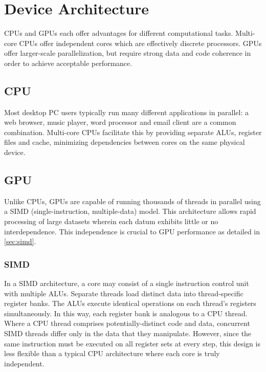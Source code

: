 \chapter{Device Architecture} \label{ch:device architecture}

CPUs and GPUs each offer advantages for different computational tasks. Multi-core CPUs offer independent cores which are effectively discrete processors. GPUs offer larger-scale parallelization, but require strong data and code coherence in order to achieve acceptable performance.

\section{CPU}

Most desktop PC users typically run many different applications in parallel: a web browser, music player, word processor and email client are a common combination. Multi-core CPUs facilitate this by providing separate ALUs, register files and cache, minimizing dependencies between cores on the same physical device. 

\section{GPU}

Unlike CPUs, GPUs are capable of running thousands of threads in parallel using a SIMD (single-instruction, multiple-data) model. This architecture allows rapid processing of large datasets wherein each datum exhibits little or no interdependence.  This independence is crucial to GPU performance as detailed in \autoref{sec:simd}.

\subsection{SIMD}\label{sec:simd}

In a SIMD\cite{Massingill:2007:SAP:1772070.1772078} architecture, a core may consist of a single instruction control unit with multiple ALUs. Separate threads load distinct data into thread-specific register banks. The ALUs execute identical operations on each thread's registers simultaneously. In this way, each register bank is analogous to a CPU thread. Where a CPU thread comprises potentially-distinct code and data, concurrent SIMD threads differ only in the data that they manipulate.  However, since the same instruction must be executed on all register sets at every step, this design is less flexible than a typical CPU architecture where each core is truly independent. 

